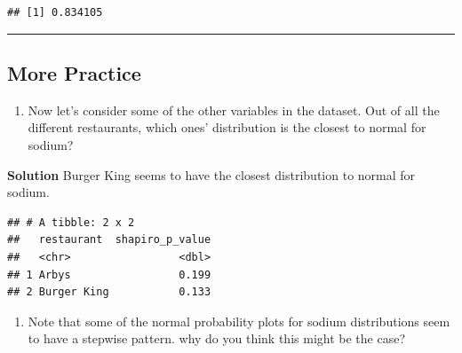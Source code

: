\documentclass[
]{article}
\newenvironment{Shaded}{\begin{snugshade}}{\end{snugshade}}
\newcommand{\AttributeTok}[1]{\textcolor[rgb]{0.13,0.29,0.53}{#1}}
\newcommand{\FloatTok}[1]{\textcolor[rgb]{0.00,0.00,0.81}{#1}}
\newcommand{\FunctionTok}[1]{\textcolor[rgb]{0.13,0.29,0.53}{\textbf{#1}}}
\newcommand{\NormalTok}[1]{#1}
\newcommand{\OtherTok}[1]{\textcolor[rgb]{0.56,0.35,0.01}{#1}}
\newcommand{\SpecialCharTok}[1]{\textcolor[rgb]{0.81,0.36,0.00}{\textbf{#1}}}
\providecommand{\tightlist}{%
  \setlength{\itemsep}{0pt}\setlength{\parskip}{0pt}}
\begin{document}
\begin{verbatim}
## [1] 0.834105
\end{verbatim}

\begin{center}\rule{0.5\linewidth}{0.5pt}\end{center}

\subsection{More Practice}\label{more-practice}

\begin{enumerate}
\def\labelenumi{\arabic{enumi}.}
\setcounter{enumi}{6}
\tightlist
\item
  Now let's consider some of the other variables in the dataset. Out of
  all the different restaurants, which ones' distribution is the closest
  to normal for sodium?
\end{enumerate}

\textbf{Solution} Burger King seems to have the closest distribution to
normal for sodium.

\begin{Shaded}
\end{Shaded}

\begin{verbatim}
## # A tibble: 2 x 2
##   restaurant  shapiro_p_value
##   <chr>                 <dbl>
## 1 Arbys                 0.199
## 2 Burger King           0.133
\end{verbatim}

\begin{enumerate}
\def\labelenumi{\arabic{enumi}.}
\setcounter{enumi}{7}
\tightlist
\item
  Note that some of the normal probability plots for sodium
  distributions seem to have a stepwise pattern. why do you think this
  might be the case?
\end{enumerate}
\end{document}
